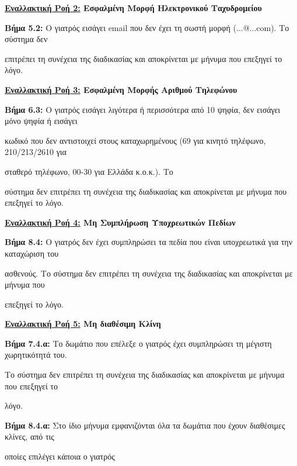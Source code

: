 \documentclass{article}
\begin{document}
\textbf{\underline{Εναλλακτική Ροή 2:} Εσφαλμένη Μορφή Ηλεκτρονικού Ταχυδρομείου} \vspace{0.2cm}
\par \textbf{Βήμα 5.2:} Ο γιατρός εισάγει email που δεν έχει τη σωστή μορφή (...@...com). Το σύστημα δεν \par επιτρέπει τη συνέχεια της διαδικασίας και αποκρίνεται με μήνυμα που επεξηγεί το λόγο.  \vspace{0.2cm}

\textbf{\underline{Εναλλακτική Ροή 3:} Εσφαλμένη Μορφής Αριθμού Τηλεφώνου} \vspace{0.2cm}
\par \textbf{Βήμα 6.3:} Ο γιατρός εισάγει λιγότερα ή περισσότερα από 10 ψηφία, δεν εισάγει μόνο ψηφία ή εισάγει \par κωδικό που δεν αντιστοιχεί στους καταχωρημένους (69 για κινητό τηλέφωνο, 210/213/2610 για \par σταθερό τηλέφωνο, 00-30 για Ελλάδα κ.ο.κ.). Το \par σύστημα δεν επιτρέπει τη συνέχεια της διαδικασίας και αποκρίνεται με μήνυμα που επεξηγεί το λόγο.  \vspace{0.2cm}

\textbf{\underline{Εναλλακτική Ροή 4:} Μη Συμπλήρωση Υποχρεωτικών Πεδίων} \vspace{0.2cm}
\par \textbf{Βήμα 8.4:} Ο γιατρός δεν έχει συμπληρώσει τα πεδία που είναι υποχρεωτικά για την καταχώριση του \par ασθενούς. Το σύστημα δεν επιτρέπει τη συνέχεια της διαδικασίας και αποκρίνεται με μήνυμα που \par επεξηγεί το λόγο.  \vspace{0.2cm}

\textbf{\underline{Εναλλακτική Ροή 5:} Μη διαθέσιμη Κλίνη} \vspace{0.2cm}
\par \textbf{Βήμα 7.4.α:} Το δωμάτιο που επέλεξε ο γιατρός έχει συμπληρώσει τη μέγιστη χωρητικότητά του. \par Το σύστημα δεν επιτρέπει τη συνέχεια της διαδικασίας και αποκρίνεται με μήνυμα που επεξηγεί το \par λόγο. \vspace{0.1cm}
\par \textbf{Βήμα 8.4.α:} Στο ίδιο μήνυμα εμφανιζόνται όλα τα δωμάτια που έχουν διαθέσιμες κλίνες, από τις \par οποίες επιλέγει κάποια ο γιατρός \vspace{0.2cm}
\end{document}
